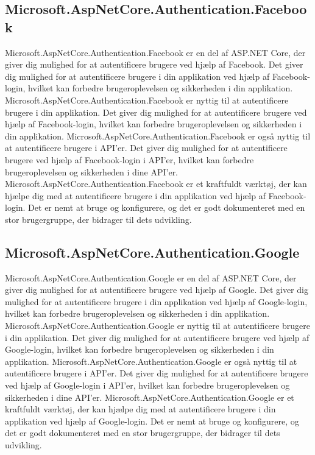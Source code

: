 \subsection{Microsoft.AspNetCore.Authentication.Facebook}
Microsoft.AspNetCore.Authentication.Facebook er en del af ASP.NET Core, der giver dig mulighed for at autentificere brugere ved hjælp af Facebook. Det giver dig mulighed for at autentificere brugere i din applikation ved hjælp af Facebook-login, hvilket kan forbedre brugeroplevelsen og sikkerheden i din applikation.
Microsoft.AspNetCore.Authentication.Facebook er nyttig til at autentificere brugere i din applikation. Det giver dig mulighed for at autentificere brugere ved hjælp af Facebook-login, hvilket kan forbedre brugeroplevelsen og sikkerheden i din applikation.
Microsoft.AspNetCore.Authentication.Facebook er også nyttig til at autentificere brugere i API'er. Det giver dig mulighed for at autentificere brugere ved hjælp af Facebook-login i API'er, hvilket kan forbedre brugeroplevelsen og sikkerheden i dine API'er.
Microsoft.AspNetCore.Authentication.Facebook er et kraftfuldt værktøj, der kan hjælpe dig med at autentificere brugere i din applikation ved hjælp af Facebook-login. Det er nemt at bruge og konfigurere, og det er godt dokumenteret med en stor brugergruppe, der bidrager til dets udvikling.

\subsection{Microsoft.AspNetCore.Authentication.Google}
Microsoft.AspNetCore.Authentication.Google er en del af ASP.NET Core, der giver dig mulighed for at autentificere brugere ved hjælp af Google. Det giver dig mulighed for at autentificere brugere i din applikation ved hjælp af Google-login, hvilket kan forbedre brugeroplevelsen og sikkerheden i din applikation.
Microsoft.AspNetCore.Authentication.Google er nyttig til at autentificere brugere i din applikation. Det giver dig mulighed for at autentificere brugere ved hjælp af Google-login, hvilket kan forbedre brugeroplevelsen og sikkerheden i din applikation.
Microsoft.AspNetCore.Authentication.Google er også nyttig til at autentificere brugere i API'er. Det giver dig mulighed for at autentificere brugere ved hjælp af Google-login i API'er, hvilket kan forbedre brugeroplevelsen og sikkerheden i dine API'er.
Microsoft.AspNetCore.Authentication.Google er et kraftfuldt værktøj, der kan hjælpe dig med at autentificere brugere i din applikation ved hjælp af Google-login. Det er nemt at bruge og konfigurere, og det er godt dokumenteret med en stor brugergruppe, der bidrager til dets udvikling.

